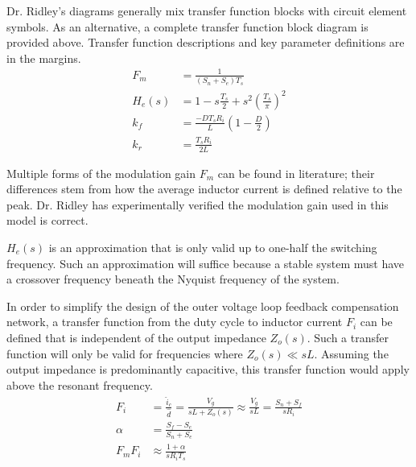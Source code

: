 \documentclass{tufte-handout}
\begin{document}

Dr. Ridley's diagrams generally mix transfer function blocks with circuit element symbols.
As an alternative, a complete transfer function block diagram is provided above.
Transfer function descriptions and key parameter definitions are in the margins.
\begin{align*}
F_m&=\frac{1}{(S_n+S_e)T_s}\\[0.75em]
H_e(s)&=1-s\frac{T_s}{2}+s^2\left(\frac{T_s}{\pi}\right)^2\\[0.75em]
k_f&=\frac{-DT_sR_i}{L}\left(1-\frac{D}{2}\right)\\[0.75em]
k_r&=\frac{T_sR_i}{2L}
\end{align*}

Multiple forms of the modulation gain $F_m$ can be found in literature; their differences stem from how the average inductor current is defined relative to the peak.
Dr. Ridley has experimentally verified the modulation gain used in this model is correct.

$H_e(s)$ is an approximation that is only valid up to one-half the switching frequency.
Such an approximation will suffice because a stable system must have a crossover frequency beneath the Nyquist frequency of the system.

In order to simplify the design of the outer voltage loop feedback compensation network, a transfer function from the duty cycle to inductor current $F_i$ can be defined that is independent of the output impedance $Z_o(s)$.
Such a transfer function will only be valid for frequencies where $Z_o(s) \ll sL$. Assuming the output impedance is predominantly capacitive, this transfer function would apply above the resonant frequency.
\begin{align*}
F_i&=\frac{\widehat{i}_c}{\widehat{d}}=\frac{V_g}{sL+Z_o(s)}\approx\frac{V_g}{sL}=\frac{S_n+S_f}{sR_i}\\[0.75em]
\alpha&=\frac{S_f-S_e}{S_n+S_e}\\[0.75em]
F_mF_i&\approx\frac{1+\alpha}{sR_iT_s}
\end{align*}
\end{document}
